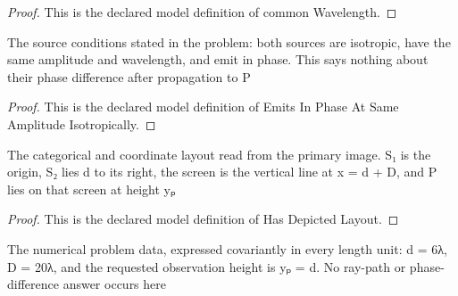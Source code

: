 \begin{proof}
  This is the declared model definition of common Wavelength.
\end{proof}
\begin{definition}
  \label{def:physics:phyx-mini-0090:phyxminiproblems-problemphyxmini0090-emitsinphaseatsameamplitudeisotropically}
  The source conditions stated in the problem: both sources are isotropic, have the same amplitude and wavelength, and emit in phase. This says nothing about their phase difference after propagation to P
\end{definition}
\begin{proof}
  This is the declared model definition of Emits In Phase At Same Amplitude Isotropically.
\end{proof}
\begin{definition}
  \label{def:physics:phyx-mini-0090:phyxminiproblems-problemphyxmini0090-hasdepictedlayout}
  The categorical and coordinate layout read from the primary image. S₁ is the origin, S₂ lies d to its right, the screen is the vertical line at x = d + D, and P lies on that screen at height yₚ
\end{definition}
\begin{proof}
  This is the declared model definition of Has Depicted Layout.
\end{proof}
\begin{definition}
  \label{def:physics:phyx-mini-0090:phyxminiproblems-problemphyxmini0090-matchesproblemreadouts}
  The numerical problem data, expressed covariantly in every length unit: d = 6λ, D = 20λ, and the requested observation height is yₚ = d. No ray-path or phase-difference answer occurs here
\end{definition}
